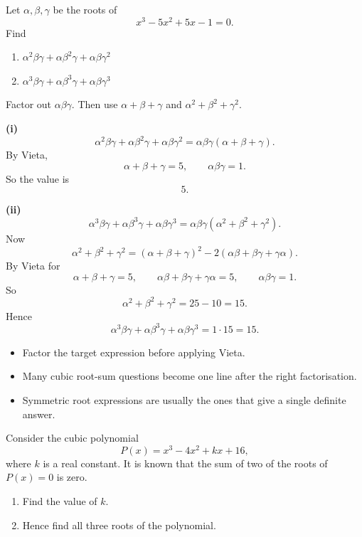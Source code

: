 \begin{problem}
Let $\alpha,\beta,\gamma$ be the roots of
\[
x^3-5x^2+5x-1=0.
\]
Find
\begin{enumerate}[label=(\roman*)]
\item $\alpha^2\beta\gamma+\alpha\beta^2\gamma+\alpha\beta\gamma^2$
\item $\alpha^3\beta\gamma+\alpha\beta^3\gamma+\alpha\beta\gamma^3$
\end{enumerate}
\end{problem}

\begin{hintbox}
Factor out $\alpha\beta\gamma$. Then use $\alpha+\beta+\gamma$ and $\alpha^2+\beta^2+\gamma^2$.
\end{hintbox}

\begin{solution}
\textbf{(i)}
\[
\alpha^2\beta\gamma+\alpha\beta^2\gamma+\alpha\beta\gamma^2
=\alpha\beta\gamma(\alpha+\beta+\gamma).
\]
By Vieta,
\[
\alpha+\beta+\gamma=5,\qquad \alpha\beta\gamma=1.
\]
So the value is
\[
\boxed{5.}
\]

\textbf{(ii)}
\[
\alpha^3\beta\gamma+\alpha\beta^3\gamma+\alpha\beta\gamma^3
=\alpha\beta\gamma(\alpha^2+\beta^2+\gamma^2).
\]
Now
\[
\alpha^2+\beta^2+\gamma^2=(\alpha+\beta+\gamma)^2-2(\alpha\beta+\beta\gamma+\gamma\alpha).
\]
By Vieta for
\[
\alpha+\beta+\gamma=5,\qquad \alpha\beta+\beta\gamma+\gamma\alpha=5,\qquad \alpha\beta\gamma=1.
\]
So
\[
\alpha^2+\beta^2+\gamma^2=25-10=15.
\]
Hence
\[
\alpha^3\beta\gamma+\alpha\beta^3\gamma+\alpha\beta\gamma^3
=1\cdot 15
=\boxed{15.}
\]
\end{solution}

\begin{takeaways}
\begin{itemize}[leftmargin=*]
\item Factor the target expression before applying Vieta.
\item Many cubic root-sum questions become one line after the right factorisation.
\item Symmetric root expressions are usually the ones that give a single definite answer.
\end{itemize}
\end{takeaways}

\begin{problem}
Consider the cubic polynomial
\[
P(x)=x^3-4x^2+kx+16,
\]
where $k$ is a real constant. It is known that the sum of two of the roots of $P(x)=0$ is zero.
\begin{enumerate}[label=(\roman*)]
\item Find the value of $k$.
\item Hence find all three roots of the polynomial.
\end{enumerate}
\end{problem}

